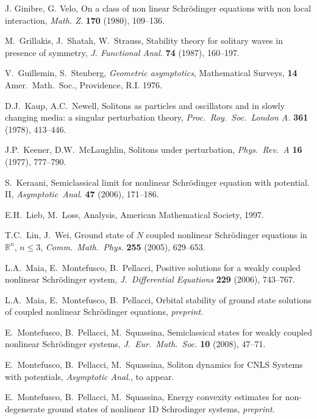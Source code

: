 \documentclass[11pt]{amsart}
\numberwithin{equation}{section}
\theoremstyle{definition}
\begin{document}
\begin{thebibliography}{999999}
{\sc  J. Ginibre, G. Velo},
On a class of non linear Schr\"odinger equations with non local interaction,
{\em Math. Z.} {\bf 170} (1980), 109--136.

{\sc M.~Grillakis, J.~Shatah, W.~Strauss},
Stability theory for solitary waves in presence of symmetry,
{\em J. Functional Anal.} {\bf 74} (1987), 160--197.

{\sc V.~Guillemin, S.~Stenberg},
{\em Geometric asymptotics}, Mathematical Surveys, {\bf 14}
Amer.~Math.~Soc., Providence, R.I. 1976.

{\sc D.J.~Kaup, A.C.~Newell},
Solitons as particles and oscillators and in slowly changing media: a
singular perturbation theory,
{\em Proc.\ Roy.\ Soc.\ London A.} {\bf 361} (1978), 413--446.

{\sc J.P.~Keener, D.W.~McLaughlin},
Solitons under perturbation,
{\em Phys.\ Rev.\ A} {\bf 16} (1977), 777--790.

{\sc S.\ Keraani},
Semiclassical limit for nonlinear Schr\"odinger equation with potential. II,
{\em Asymptotic\ Anal.} {\bf 47} (2006), 171--186.

{\sc E.H.\ Lieb, M.\ Loss},
Analysis, American Mathematical Society, 1997.

{\sc T.C.~Lin, J.~Wei},
Ground state of $N$ coupled nonlinear Schr\"odinger equations in ${{\mathbb R}}^n$, $n\leq3$,
{\em Comm.\ Math.\ Phys.} {\bf 255} (2005), 629--653.

{\sc L.A.~Maia, E.~Montefusco, B.~Pellacci},
Positive solutions for a weakly coupled  nonlinear Schr\"odinger system,
{\em J.\ Differential Equations} {\bf 229} (2006), 743--767.

{\sc L.A.~Maia, E.~Montefusco, B.~Pellacci},
Orbital stability of ground state solutions of coupled nonlinear Schr\"odinger equations,
{\em preprint}.

{\sc  E.~Montefusco, B.~Pellacci, M.~Squassina},
Semiclassical states for weakly coupled nonlinear Schr\"odinger systems,
{\em J.\ Eur.\ Math.\ Soc.} {\bf 10} (2008), 47--71.

{\sc  E.~Montefusco, B.~Pellacci, M.~Squassina},
Soliton dynamics for CNLS Systems with potentials,
{\em Asymptotic Anal.}, to appear.

{\sc E.~Montefusco, B.~Pellacci, M.~Squassina},
Energy convexity estimates for non-degenerate ground states of nonlinear 1D Schrodinger systems,
{\em preprint}.


\end{thebibliography}
\end{document}
